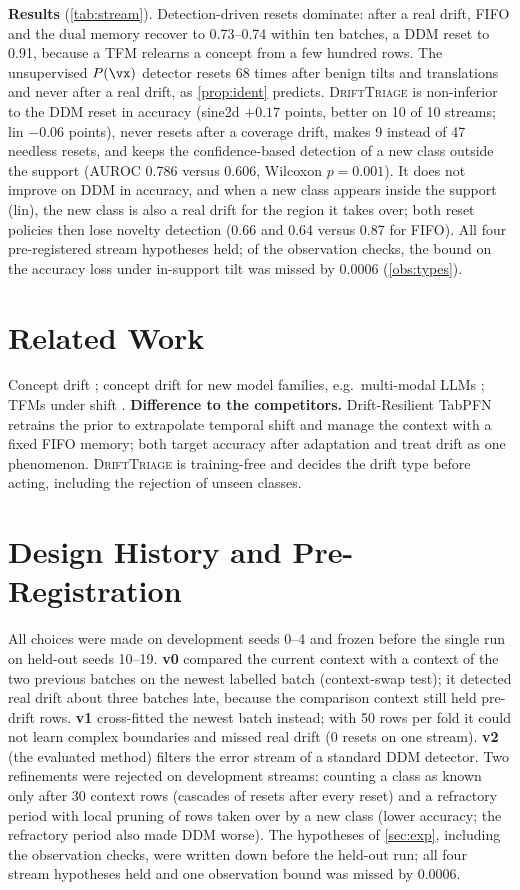 \documentclass{article}
\theoremstyle{plain}
\theoremstyle{definition}
\theoremstyle{remark}
\newcommand{\method}{\textsc{DriftTriage}}   %
\begin{document}
\textbf{Results} (\cref{tab:stream}). Detection-driven resets dominate: after a real drift, FIFO and the dual memory
recover to 0.73--0.74 within ten batches, a DDM reset to 0.91, because a TFM relearns a concept from a few hundred
rows. The unsupervised $P(\vx)$ detector resets 68 times after benign tilts and translations and never after a real
drift, as \cref{prop:ident} predicts. \method{} is non-inferior to the DDM reset in accuracy (sine2d $+0.17$ points,
better on 10 of 10 streams; lin $-0.06$ points), never resets after a coverage drift, makes 9 instead of 47 needless
resets, and keeps the confidence-based detection of a new class outside the support (AUROC 0.786 versus 0.606,
Wilcoxon $p=0.001$). It does not improve on DDM in accuracy, and when a new class appears inside the support (lin), the
new class is also a real drift for the region it takes over; both reset policies then lose novelty detection (0.66 and
0.64 versus 0.87 for FIFO). All four pre-registered stream hypotheses held; of the observation checks, the bound on the
accuracy loss under in-support tilt was missed by 0.0006 (\cref{obs:types}).

\section{Related Work}
Concept drift \citep{gama2014survey,lu2019learning}; concept drift for new model families, e.g.\ multi-modal LLMs
\citep{yang2025adapting,yang2025walking,yang2026turning}; TFMs under shift \citep{helli2024drift,lourenco2026streams}.
\textbf{Difference to the competitors.} Drift-Resilient TabPFN retrains the prior to extrapolate temporal shift and
\citet{lourenco2026streams} manage the context with a fixed FIFO memory; both target accuracy after adaptation and
treat drift as one phenomenon. \method{} is training-free and decides the drift type before acting, including the
rejection of unseen classes.


\appendix
\section{Design History and Pre-Registration}
\label{app:history}
All choices were made on development seeds 0--4 and frozen before the single run on held-out seeds 10--19.
\textbf{v0} compared the current context with a context of the two previous batches on the newest labelled batch
(context-swap test); it detected real drift about three batches late, because the comparison context still held
pre-drift rows. \textbf{v1} cross-fitted the newest batch instead; with 50 rows per fold it could not learn complex
boundaries and missed real drift (0 resets on one stream). \textbf{v2} (the evaluated method) filters the error stream
of a standard DDM detector. Two refinements were rejected on development streams: counting a class as known only after
30 context rows (cascades of resets after every reset) and a refractory period with local pruning of rows taken over by
a new class (lower accuracy; the refractory period also made DDM worse). The hypotheses of \cref{sec:exp}, including
the observation checks, were written down before the held-out run; all four stream hypotheses held and one observation
bound was missed by 0.0006.



\end{document}

